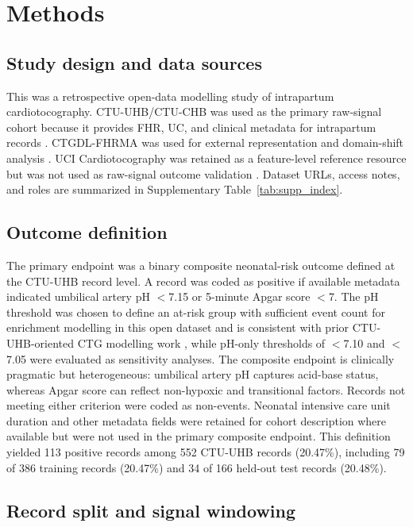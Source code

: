 \documentclass[pdflatex,sn-nature]{sn-jnl}
\begin{document}
\section{Methods}

\subsection{Study design and data sources}

This was a retrospective open-data modelling study of intrapartum cardiotocography. CTU-UHB/CTU-CHB was used as the primary raw-signal cohort because it provides FHR, UC, and clinical metadata for intrapartum records \cite{goldberger2000,chudacek2014,ctuuhb}. CTGDL-FHRMA was used for external representation and domain-shift analysis \cite{ctgdl}. UCI Cardiotocography was retained as a feature-level reference resource but was not used as raw-signal outcome validation \cite{uci}. Dataset URLs, access notes, and roles are summarized in Supplementary Table~\ref{tab:supp_index}.

\subsection{Outcome definition}

The primary endpoint was a binary composite neonatal-risk outcome defined at the CTU-UHB record level. A record was coded as positive if available metadata indicated umbilical artery pH $<$7.15 or 5-minute Apgar score $<$7. The pH threshold was chosen to define an at-risk group with sufficient event count for enrichment modelling in this open dataset and is consistent with prior CTU-UHB-oriented CTG modelling work \cite{chudacek2014,deepctg2023}, while pH-only thresholds of $<$7.10 and $<$7.05 were evaluated as sensitivity analyses. The composite endpoint is clinically pragmatic but heterogeneous: umbilical artery pH captures acid-base status, whereas Apgar score can reflect non-hypoxic and transitional factors. Records not meeting either criterion were coded as non-events. Neonatal intensive care unit duration and other metadata fields were retained for cohort description where available but were not used in the primary composite endpoint. This definition yielded 113 positive records among 552 CTU-UHB records (20.47\%), including 79 of 386 training records (20.47\%) and 34 of 166 held-out test records (20.48\%).

\subsection{Record split and signal windowing}
\end{document}
